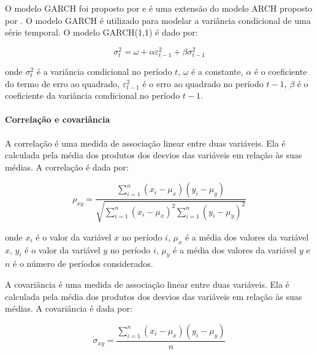                 \ipar O modelo \acrshort{GARCH} foi proposto por \cite{bollerslev1986generalized} e é uma extensão do modelo \acrshort{ARCH} proposto por \cite{engle1982autoregressive}. O modelo \acrshort{GARCH} é utilizado para modelar a variância condicional de uma série temporal. O modelo \acrshort{GARCH}(1,1) é dado por:

                \begin{equation}
                    \label{eq:GARCH}
                    \sigma_t^2 = \omega + \alpha \varepsilon_{t-1}^2 + \beta \sigma_{t-1}^2
                \end{equation}

                \noindent onde $\sigma_t^2$ é a variância condicional no período $t$, $\omega$ é a constante, $\alpha$ é o coeficiente do termo de erro ao quadrado, $\varepsilon_{t-1}^2$ é o erro ao quadrado no período $t-1$, $\beta$ é o coeficiente da variância condicional no período $t-1$.


            \paragraph{Correlação e covariância}
                
                \ipar A correlação é uma medida de associação linear entre duas variáveis. Ela é calculada pela média dos produtos dos desvios das variáveis em relação às suas médias. A correlação é dada por:

                \begin{equation}
                    \rho_{xy} = \frac{{\sum_{i=1}^{n} (x_i - \mu_x)(y_i - \mu_y)}}{{\sqrt{\sum_{i=1}^{n} (x_i - \mu_x)^2 \sum_{i=1}^{n} (y_i - \mu_y)^2}}}
                \end{equation}

                \noindent onde $x_i$ é o valor da variável $x$ no período $i$, $\mu_x$ é a média dos valores da variável $x$, $y_i$ é o valor da variável $y$ no período $i$, $\mu_y$ é a média dos valores da variável $y$ e $n$ é o número de períodos considerados.

                \ipar A covariância é uma medida de associação linear entre duas variáveis. Ela é calculada pela média dos produtos dos desvios das variáveis em relação às suas médias. A covariância é dada por:

                \begin{equation}
                    \sigma_{xy} = \frac{{\sum_{i=1}^{n} (x_i - \mu_x)(y_i - \mu_y)}}{{n}}
                \end{equation}

